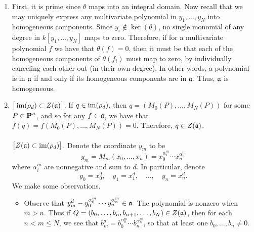 \documentclass[10pt]{amsart}
\begin{document}
\begin{solution}
    \begin{luke}
        \begin{enumerate}
            \item First, it is prime since $\theta$ maps into an integral domain.
            Now recall that we may uniquely express
            any multivariate polynomial in $y_1, \dots, y_N$ into 
            homogeneous components. Since $y_i \not\in \ker(\theta)$, 
            no single monomial of any degree in $k[y_1, \dots, y_N]$ 
            maps to zero. Therefore, if
            for a multivariate polynomial $f$ we have that $\theta(f) = 0$, 
            then it must be that each 
            of the homogeneous components of $\theta(f_i)$ must map to zero, by 
            individually canceling each other out (in their own degree). 
            In other words, a polynomial is in $\mathfrak{a}$
            if and only if its homogeneous components are in $\mathfrak{a}$. 
            Thus, $\mathfrak{a}$ is homogeneous. 

            \item ${\big[}\operatorname{im}(\rho_d) \subset Z(\mathfrak{a}){\big]}$. 
            If $q \in \operatorname{im}(\rho_d)$, then $q = (M_0(P), \dots, M_N(P))$ for some $P \in \operatorname{\mathbf{P}}^n$, 
            and so for any $f \in \mathfrak{a}$, we have that $f(q) = f(M_0(P), \dots, M_N(P)) = 0.$
            Therefore, $q \in Z(\mathfrak{a})$.
            \\
            \\
            \noindent ${\big[}Z(\mathfrak{a}) \subset \operatorname{im}(\rho_d){\big]}$. 
            Denote the coordinate $y_m$ to be 
            \[
                y_m =    M_m(x_0, \dots, x_n) = x_0^{\alpha_1^m} \cdots x_n^{\alpha_n^{m}}
            \]
            where $\alpha^m_i$ are nonnegative and sum to $d$. In particular, denote
            \[
                y_0 = x_0^d, \quad y_1 = x_1^d, \quad \dots, \quad y_n = x_n^{d}.
            \]
            We make some observations. 
            \begin{itemize}
                \item Observe that $y_m^d - y_0^{\alpha_0^m} \cdots y_n^{\alpha_n^{m}} \in \mathfrak{a}.$
                The polynomial is nonzero when $m > n$. 
                Thus if $ Q = (b_0, \dots, b_n, b_{n+1}, \dots, b_{N}) \in Z(\mathfrak{a})$, then for each $n < m \le N$, we see that 
                $b_m^d = b_0^{\alpha_0^m} \cdots b_n^{\alpha_n^{m}}$, so that at least one $b_0, \dots, b_n \ne 0$.



\end{itemize}
\end{enumerate}
\end{luke}
\end{solution}
\end{document}
